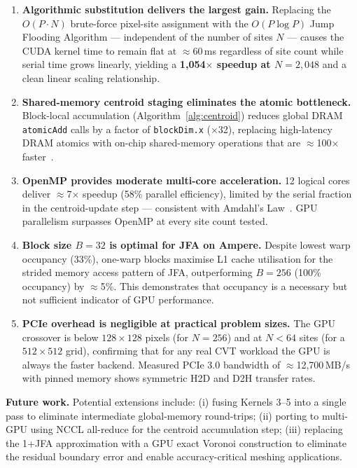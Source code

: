 \documentclass[12pt,a4paper]{article}
\begin{document}
\begin{enumerate}

    \item \textbf{Algorithmic substitution delivers the largest gain.}
          Replacing the $O(P \cdot N)$ brute-force pixel-site assignment
          with the $O(P \log P)$ Jump Flooding Algorithm --- independent of
          the number of sites $N$ --- causes the CUDA kernel time to
          remain flat at $\approx$60\,ms regardless of site count while
          serial time grows linearly, yielding a \textbf{1{,}054$\times$
          speedup at $N=2{,}048$} and a clean linear scaling relationship.

    \item \textbf{Shared-memory centroid staging eliminates the atomic
          bottleneck.}  Block-local accumulation (Algorithm~\ref{alg:centroid})
          reduces global DRAM \texttt{atomicAdd} calls by a factor of
          \texttt{blockDim.x} ($\times$32), replacing high-latency DRAM
          atomics with on-chip shared-memory operations that are
          $\approx$100$\times$ faster~\cite{harris2007optimizing}.

    \item \textbf{OpenMP provides moderate multi-core acceleration.}
          12 logical cores deliver $\approx$7$\times$ speedup (58\% parallel
          efficiency), limited by the serial fraction in the centroid-update
          step --- consistent with Amdahl's Law~\cite{amdahl1967validity}.
          GPU parallelism surpasses OpenMP at every site count tested.

    \item \textbf{Block size $B=32$ is optimal for JFA on Ampere.}
          Despite lowest warp occupancy (33\%), one-warp blocks maximise
          L1 cache utilisation for the strided memory access pattern of
          JFA, outperforming $B=256$ (100\% occupancy) by $\approx$5\%.
          This demonstrates that occupancy is a necessary but not sufficient
          indicator of GPU performance.

    \item \textbf{PCIe overhead is negligible at practical problem sizes.}
          The GPU crossover is below $128\times128$ pixels (for $N=256$)
          and at $N{<}64$ sites (for a $512\times512$ grid), confirming
          that for any real CVT workload the GPU is always the faster
          backend.  Measured PCIe 3.0 bandwidth of $\approx$12{,}700\,MB/s
          with pinned memory shows symmetric H2D and D2H transfer rates.

\end{enumerate}

\noindent\textbf{Future work.}
Potential extensions include: (i) fusing Kernels 3--5 into a single
pass to eliminate intermediate global-memory round-trips; (ii) porting
to multi-GPU using NCCL all-reduce for the centroid accumulation step;
(iii) replacing the 1+JFA approximation with a GPU exact Voronoi
construction to eliminate the residual boundary error and enable
accuracy-critical meshing applications.

\newpage
{}


\end{document}
